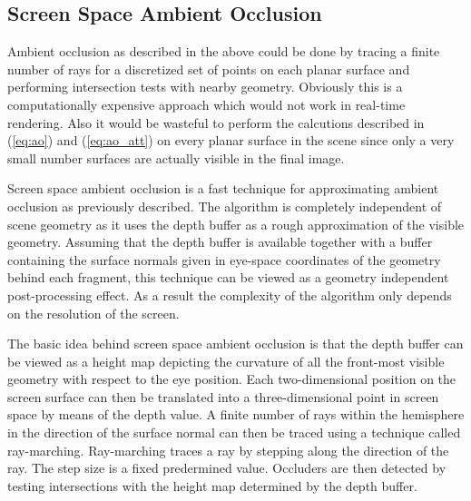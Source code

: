 \subsection{Screen Space Ambient Occlusion}
\label{sec:ssao}
Ambient occlusion as described in the above could be done by tracing a
finite number of rays for a discretized set of points on each planar
surface and performing intersection tests with nearby
geometry. Obviously this is a computationally expensive approach which
would not work in real-time rendering. Also it would be wasteful to
perform the calcutions described in (\ref{eq:ao}) and
(\ref{eq:ao_att}) on every planar surface in the scene since only a
very small number surfaces are actually visible in the final image.

Screen space ambient occlusion \citep{ssao} is a fast technique for
approximating ambient occlusion as previously described. The algorithm
is completely independent of scene geometry as it uses the depth
buffer as a rough approximation of the visible geometry. Assuming that
the depth buffer is available together with a buffer containing the
surface normals given in eye-space coordinates of the geometry
behind each fragment, this technique can be viewed as a geometry
independent post-processing effect. As a result the complexity of the
algorithm only depends on the resolution of the screen.

The basic idea behind screen space ambient occlusion is that the depth
buffer can be viewed as a height map depicting the curvature of
all the front-most visible geometry with respect to the eye
position. Each two-dimensional position on the screen surface
can then be translated into a three-dimensional point in screen space by
means of the depth value. A finite number of rays within the hemisphere
in the direction of the surface normal can then be traced using a
technique called ray-marching. Ray-marching traces a ray by stepping
along the direction of the ray. The step size is a fixed predermined
value. Occluders are then detected by testing intersections with the
height map determined by the depth buffer.

